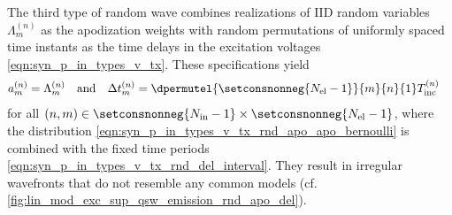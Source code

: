 The third type of
random wave combines
realizations of
\ac{IID} random variables $\Lambda_{m}^{(n)}$ as
the apodization weights with
random permutations of
uniformly spaced time instants as
the time delays in
the excitation voltages
\eqref{eqn:syn_p_in_types_v_tx}.
These specifications yield
\begin{align}
  a_{m}^{(n)}
  &=
  \Lambda_{m}^{(n)}
  & \text{and} & &
  \Delta t_{m}^{(n)}
  &=
  \dpermutel{ \setconsnonneg{ N_{\text{el}} - 1 } }{ m }{ n }{1}
  T_{\text{inc}}^{(n)}
 \label{eqn:syn_p_in_types_v_tx_rnd_apo_del}
\end{align}
for
all $( n, m ) \in \setconsnonneg{ N_{\text{in}} - 1 } \times \setconsnonneg{ N_{\text{el}} - 1 }$, where
the  distribution
\eqref{eqn:syn_p_in_types_v_tx_rnd_apo_apo_bernoulli} is combined with
the fixed time periods
\eqref{eqn:syn_p_in_types_v_tx_rnd_del_interval}.
They result in
irregular wavefronts that
do not resemble
any common models
(cf. \cref{fig:lin_mod_exc_sup_qsw_emission_rnd_apo_del}).
